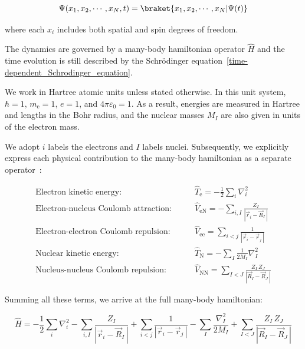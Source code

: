 \begin{equation}
    \Psi(x_1,x_2,\cdots,x_N,t)=\braket{x_1,x_2,\cdots,x_N|\Psi(t)}
\label{many-body_wave_function}
\end{equation}

where each $x_i$ includes both spatial and spin degrees of freedom.

The dynamics are governed by a many-body hamiltonian operator $\hat{H}$ and the time evolution is still described by the Schrödinger equation~\eqref{time-dependent_Schrodinger_equation}.

We work in Hartree atomic units unless stated otherwise.
In this unit system, $\hbar=1$, $m_\mathrm{e}=1$, $e=1$, and $4\pi\varepsilon_0=1$.
As a result, energies are measured in Hartree and lengths in the Bohr radius, and the nuclear masses $M_I$ are also given in units of the electron mass.

We adopt $i$ labels the electrons and $I$ labels nuclei.
Subsequently, we explicitly express each physical contribution to the many-body hamiltonian as a separate operator~\cite{sholl2022density}:

\begin{align}
\text{Electron kinetic energy:}\qquad & \hat{T}_\mathrm{e} = -\frac{1}{2}\sum_i\nabla_i^2
\label{electrons_kinetic} \\
\text{Electron-nucleus Coulomb attraction:}\qquad & \hat{V}_\mathrm{eN}=-\sum_{i,I}\frac{Z_I}{|\vec{r}_i-\vec{R}_I\,|}
\label{electrons_nucleus_Coulomb} \\
\text{Electron-electron Coulomb repulsion:}\qquad & \hat{V}_\mathrm{ee}=\sum_{i<j}\frac{1}{|\vec{r}_i-\vec{r}_j\,|}
\label{electrons_Coulomb} \\
\text{Nuclear kinetic energy:}\qquad & \hat{T}_\mathrm{N} = -\sum_I\frac{1}{2M_I}\nabla_I^2
\label{nucleus_kinetic} \\
\text{Nucleus-nucleus Coulomb repulsion:}\qquad & \hat{V}_\mathrm{NN} = \sum_{I<J}\frac{Z_I\,Z_J}{|\vec{R}_I-\vec{R}_J\,|}
\label{nucleus_interaction}
\end{align}

Summing all these terms, we arrive at the full many-body hamiltonian:

\begin{equation}
    \hat{H}=-\frac{1}{2}\sum_i\nabla_i^2
    -\sum_{i,I}\frac{Z_I}{|\vec{r}_i-\vec{R}_I\,|}
    +\sum_{i<j}\frac{1}{|\vec{r}_i-\vec{r}_j\,|}
    -\sum_I\frac{\nabla_I^2}{2M_I}
    +\sum_{I<J}\frac{Z_I\,Z_J}{|\vec{R}_I-\vec{R}_J\,|}
\label{full_many-body_hamiltonian}
\end{equation}

